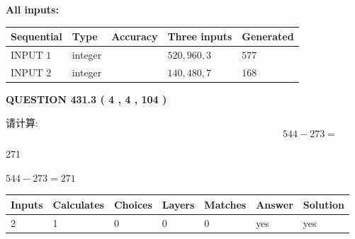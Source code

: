 \documentclass{ctexart}
\begin{document}
   
   
   
\noindent\vspace{0.1in}\hspace{-0.08in} {\textbf{\Large{All inputs: }}}
   
   
  
  
\noindent\begin{tabular}{|l|l|l|l|l|}
\hline
 Sequential & Type & Accuracy & Three inputs & Generated \\ 
\hline
 
 
  INPUT $  1 $ & integer &  & $
 520
 , 
 960
 , 
 3
 $ & $ 577 $ 
 \\  \hline  
 
 
  INPUT $  2 $ & integer &  & $
 140
 , 
 480
 , 
 7
 $ & $ 168 $ 
 \\  \hline  
 \end{tabular}
   
   
  
\vspace{0.2in}
  
{\textbf{\Large{QUESTION
431.3 
 ( 4 , 4 , 104 )
}}}
  
  
 
请计算:
\begin{equation}
544 -   %
273 = \nonumber
\end{equation}
 
 
 
\noindent{}
 
 

271
 
 
\noindent{}
 
 

 
 
 
\noindent{}
 
 

$ %
544 -  %
273=   %
271$
 
 
\noindent{}
 
 

 
   
   
   
   
\noindent\begin{tabular}{|l|l|l|l|l|l|l|}
 \hline
Inputs & Calculates & Choices & Layers & Matches & Answer & Solution \\ \hline
 2  & 
 1  & 
 0
  & 
 0  & 
 0  & 
  yes & 
  yes 
  \\ \hline
 \end{tabular}
   
\end{document}
